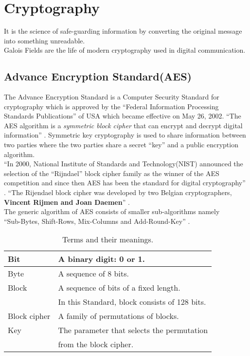   \section{Cryptography}
It is the science of safe-guarding information by converting the original message into something unreadable.\\
Galois Fields are the life of modern cryptography used in digital communication.

\subsection{Advance Encryption Standard(AES)}
The Advance Encryption Standard is a Computer Security Standard for cryptography which is approved by the ``Federal Information Processing Standards Publications'' of USA which became effective on May 26, 2002. ``The AES algorithm is a \textit{symmetric block cipher} that can encrypt and decrypt digital information'' \cite{aes}. Symmetric key cryptography is used to share information between two parties where the two parties share a secret ``key'' and a public encryption algorithm.\\

``In 2000, National Institute of Standards and Technology(NIST) announced the selection of the ``Rijndael'' block cipher family as the winner of the AES competition and since then AES has been the standard for digital cryptography'' \cite{aes}. ``The Rijendael block cipher was developed by two Belgian cryptographers, \textbf{Vincent Rijmen and Joan Daemen}'' \cite{aes}.\\

The generic algorithm of AES consists of smaller sub-algorithms namely\\ ``Sub-Bytes, Shift-Rows, Mix-Columns and Add-Round-Key'' \cite{aes}.

\begin{table}[h!]
  \centering
\begin{tabular}{|l|l|}
  \hline
  Bit & \hspace{7mm}A binary digit: 0 or 1.\\
    \hline
  Byte & \hspace{7mm}A sequence of 8 bits.\\
    \hline
  Block & \hspace{7mm} A sequence of bits of a fixed length.\\
  \ & \hspace{13mm}In this Standard, block consists of 128 bits.\\
    \hline
  Block cipher &  \hspace{7mm} A family of permutations of blocks.\\
    \hline
  Key & \hspace{7mm}The parameter that selects the permutation\\
  \ & \hspace{13mm}from the block cipher.\\
    \hline
\end{tabular}
\caption{\small Terms and their meanings.}
\end{table}


